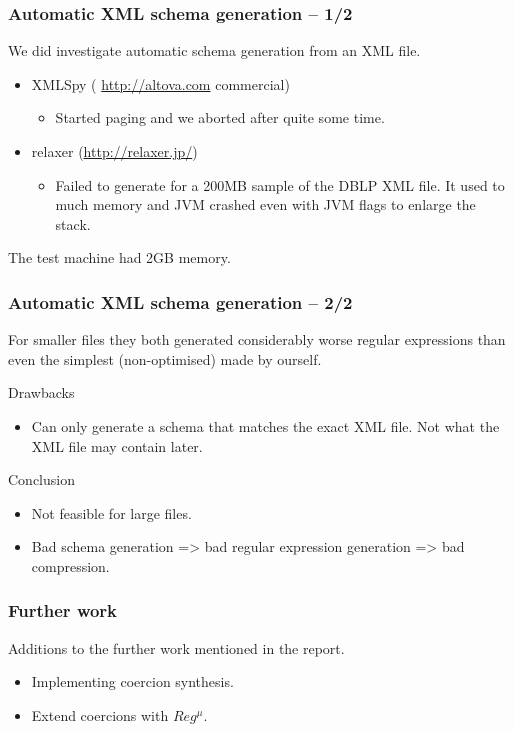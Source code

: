 \documentclass[slidestop,compress,mathserif, xcolor=table]{beamer}
\begin{document}
\begin{frame}[c]
  \frametitle{Automatic XML schema generation -- 1/2}
  
  We did investigate automatic schema generation from an XML file.

  \begin{itemize}
  \item XMLSpy ( \url{http://altova.com} commercial)
    \begin{itemize}
    \item Started paging and we aborted after quite some time.
    \end{itemize}

  \item relaxer (\url{http://relaxer.jp/})
    \begin{itemize}
    \item Failed to generate for a 200MB sample of the DBLP XML file. It
      used to much memory and JVM crashed even with JVM flags to enlarge the stack.
    \end{itemize}
  \end{itemize}

  The test machine had 2GB memory.

\end{frame}

\begin{frame}[c]
  \frametitle{Automatic XML schema generation -- 2/2}
  
  For smaller files they both generated considerably worse regular expressions
  than even the simplest (non-optimised) made by ourself.

  Drawbacks

  \begin{itemize}
  \item Can only generate a schema that matches the exact XML file. Not what the
    XML file may contain later. 
  \end{itemize}

  Conclusion 

  \begin{itemize}
  \item Not feasible for large files.

  \item Bad schema generation => bad regular expression generation => bad compression.
  \end{itemize}

\end{frame}

\begin{frame}[c]
  \frametitle{Further work}
  
  Additions to the further work mentioned in the report.

  \begin{itemize}
  \item Implementing coercion synthesis.

  \item Extend coercions with $Reg^\mu$.

  \end{itemize}

\end{frame}
\end{document}
